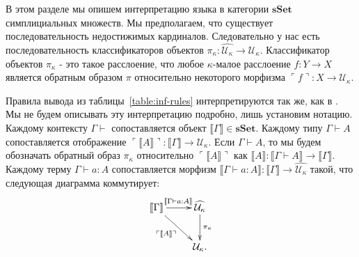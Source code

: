 \documentclass{amsart}
\theoremstyle{definition}
\theoremstyle{remark}
\newcommand{\cat}[1]{\mathbf{#1}}
\newcommand{\sSet}{\cat{sSet}}
\renewcommand{\ll}{\llbracket}
\newcommand{\rr}{\rrbracket}
\numberwithin{figure}{section}
\begin{document}
В этом разделе мы опишем интерпретацию языка в категории $\sSet$ симплициальных множеств.
Мы предполагаем, что существует последовательность недостижимых кардиналов.
Следовательно у нас есть последовательность классификаторов объектов $\pi_\kappa : \widehat{\mathcal{U}_\kappa} \to \mathcal{U}_\kappa$.
Классификатор объектов $\pi_\kappa$ - это такое расслоение, что любое $\kappa$-малое расслоение $f : Y \to X$ является обратным образом $\pi$ относительно некоторого морфизма $\ulcorner f \urcorner : X \to \mathcal{U}_\kappa$.

Правила вывода из таблицы~\ref{table:inf-rules} интерпретируются так же, как в \cite{kap-lum-voe}.
Мы не будем описывать эту интерпретацию подробно, лишь установим нотацию.
Каждому контексту $\Gamma \vdash$ сопоставляется объект $\ll \Gamma \rr \in \sSet$.
Каждому типу $\Gamma \vdash A$ сопоставляется отображение $\ulcorner \ll A \rr \urcorner : \ll \Gamma \rr \to \mathcal{U}_\kappa$.
Если $\Gamma \vdash A$, то мы будем обозначать обратный образ $\pi_\kappa$ относительно $\ulcorner \ll A \rr \urcorner$ как $\ll A \rr : \ll \Gamma \vdash A \rr \to \ll \Gamma \rr$.
Каждому терму $\Gamma \vdash a : A$ сопоставляется морфизм $\ll \Gamma \vdash a : A \rr : \ll \Gamma \rr \to \widehat{\mathcal{U}_\kappa}$ такой, что следующая диаграмма коммутирует:
\[ \xymatrix{ \ll \Gamma \rr \ar[r]^{\ll \Gamma \vdash a : A \rr} \ar[dr]_{\ulcorner \ll A \rr \urcorner} & \widehat{\mathcal{U}_\kappa} \ar[d]^{\pi_\kappa} \\
                                                                                                          & \mathcal{U}_\kappa.
            }\]
\end{document}
